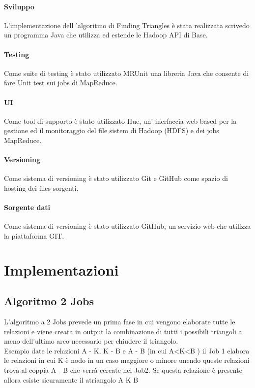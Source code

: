 \documentclass[paper=a4, fontsize=11pt]{scrartcl}	%
\numberwithin{equation}{section}															%
\numberwithin{figure}{section}																%
\numberwithin{table}{section}																%
\begin{document}
\paragraph{Sviluppo}
L'implementazione dell 'algoritmo di Finding Triangles  è stata realizzata scrivedo un programma Java che utilizza ed estende le Hadoop API di Base.
\paragraph{Testing}
Come suite di testing è stato utilizzato MRUnit una libreria Java che consente di fare Unit test sui jobs di MapReduce.
\paragraph{UI}
Come tool di supporto è stato utilizzato Hue, un' inerfaccia web-based per la gestione ed il monitoraggio del file sistem di Hadoop (HDFS) e dei jobs MapReduce.
\paragraph{Versioning}
Come sistema di versioning è stato utilizzato Git e GitHub come spazio di hosting dei files sorgenti.
\paragraph{Sorgente dati}
Come sistema di versioning è stato utilizzato GitHub, un servizio web che utilizza la piattaforma GIT.


\section{Implementazioni}
\subsection{Algoritmo 2 Jobs}
L'algoritmo a 2 Jobs prevede un prima fase in cui vengono elaborate tutte le relazioni e viene creata in output la combinazione di tutti i possibili triangoli a meno dell'ultimo arco necessario per chiudere il triangolo.\\
Esempio date le relazioni A - K, K - B e A - B  (in cui A<K<B ) il Job 1 elabora le relazioni in cui K è nodo in un caso maggiore o minore unendo queste relazioni trova al coppia A - B che verrà cercate nel Job2. Se questa relazione è presente allora esiste sicuramente il atriangolo A K B
\end{document}
